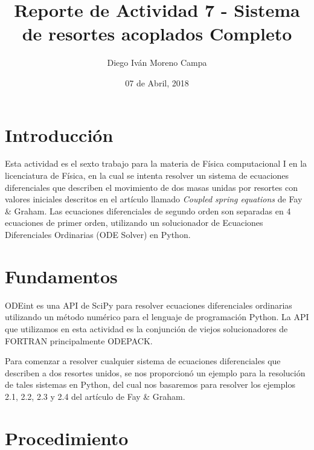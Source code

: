 \documentclass{article}
\title{Reporte de Actividad 7 - Sistema de resortes acoplados Completo}
\author{Diego Iván Moreno Campa}
\date{07 de Abril, 2018}
\begin{document}
\maketitle

\bigskip

\section{Introducción}

Esta actividad es el sexto trabajo para la materia de Física computacional I en la licenciatura de Física, en la cual se intenta resolver un sistema de ecuaciones diferenciales que describen el movimiento de dos masas unidas por resortes con valores iniciales descritos en el artículo llamado \textit{Coupled spring equations} de Fay \& Graham. Las ecuaciones diferenciales de segundo orden son separadas en 4 ecuaciones de primer orden, utilizando un solucionador de Ecuaciones Diferenciales Ordinarias (ODE Solver) en Python.

\section{Fundamentos}

ODEint es una API de SciPy para resolver ecuaciones diferenciales ordinarias utilizando un método numérico para el lenguaje de programación Python. La API que utilizamos en esta actividad es la conjunción de viejos solucionadores de FORTRAN principalmente ODEPACK.

Para comenzar a resolver cualquier sistema de ecuaciones diferenciales que describen a dos resortes unidos, se nos proporcionó un ejemplo para la resolución de tales sistemas en Python, del cual nos basaremos para resolver los ejemplos 2.1, 2.2, 2.3 y 2.4 del artículo de Fay \& Graham.

\newpage

\section{Procedimiento}
\end{document}
